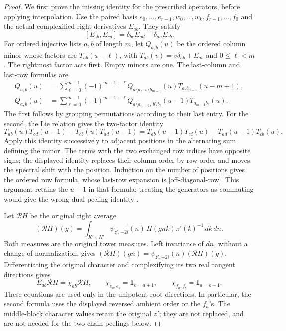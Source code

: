 \begin{proof}
We first prove the missing identity for the prescribed
operators, before applying interpolation.
Use the paired basis $e_0,\ldots,e_{r-1},w_0,\ldots,w_k,
f_{r-1},\ldots,f_0$ and the actual complexified right
derivatives $E_{ab}$.  They satisfy
\[
 [E_{ab},E_{cd}]=\delta_{bc}E_{ad}-\delta_{da}E_{cb}.
\]
For ordered injective lists $a,b$ of length $m$, let
$Q_{a,b}(u)$ be the ordered column minor whose factors
are $T_{ab}(u-\ell)$, with
$T_{ab}(v)=v\delta_{ab}+E_{ab}$ and $0\le\ell<m$.
The rightmost factor acts first.  Empty minors are one.
The last-column and last-row formulas are
\begin{align}
 Q_{a,b}(u)
 &=\sum_{\ell=0}^{m-1}(-1)^{m-1+\ell}
 Q_{a\setminus a_\ell,\,b\setminus b_{m-1}}(u)
                  T_{a_\ell b_{m-1}}(u-m+1),
                                      \label{off-diagonal-col}\\
 Q_{a,b}(u)
 &=\sum_{\ell=0}^{m-1}(-1)^{m-1+\ell}
 Q_{a\setminus a_{m-1},\,b\setminus b_\ell}(u-1)
                  T_{a_{m-1}b_\ell}(u).
                                      \label{off-diagonal-row}
\end{align}
The first follows by grouping permutations according to
their last entry.  For the second, the Lie relation gives
the two-factor identity
\[
 T_{ab}(u)T_{cd}(u-1)-T_{cb}(u)T_{ad}(u-1)
 =T_{ab}(u-1)T_{cd}(u)-T_{ad}(u-1)T_{cb}(u).
\]
Apply this identity successively to adjacent positions in
the alternating sum defining the minor.  The terms with
the two exchanged row indices have opposite signs;
the displayed identity replaces their column order by
row order and moves the spectral shift with the position.
Induction on the number of positions gives the ordered
row formula, whose last-row expansion is
\eqref{off-diagonal-row}.  This argument retains the
$u-1$ in that formula; treating the generators as
commuting would give the wrong dual peeling identity
\cite{off-diagonal-source}.

Let $\mathcal R H$ be the original right average
\[
 (\mathcal R H)(g)=\int_{K'\times N'}
 \overline{\psi_{z',-2i}(n)}\,H(gnk)
                         \pi'(k)^{-1}\,dk\,dn.
\]
Both measures are the original tower measures.  Left
invariance of $dn$, without a change of normalization,
gives $(\mathcal R H)(gn)=\psi_{z',-2i}(n)(\mathcal R H)(g)$.
Differentiating the original character and complexifying
its two real tangent directions gives
\begin{equation}\label{off-diagonal-character}
 E_{ab}\mathcal R H=\chi_{ab}\mathcal R H,
 \qquad
 \chi_{e_a,e_b}=\mathbf1_{b=a+1},\qquad
 \chi_{f_a,f_b}=\mathbf1_{a=b+1}.
\end{equation}
These equations are used only in the unipotent root
directions.  In particular, the second formula uses the
displayed reversed ambient order on the $f_a$'s.
The middle-block character values retain the original
$z'$; they are not replaced, and are not needed for
the two chain peelings below.


\end{proof}
